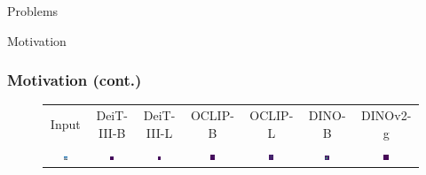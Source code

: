 \documentclass[aspectratio=169]{beamer}
\begin{document}
\begin{section}{Problems}
\begin{subsection}{Motivation}
\begin{frame}
\frametitle{Motivation (cont.)}
\vspace{0.5em}
\begin{figure}[h]
    \centering
    {\footnotesize
    \setlength{\tabcolsep}{2.5pt} %
    \renewcommand{\arraystretch}{0.4} %
    \begin{tabular}{c cc cc cc }
      \vspace{0.2em}
      Input & DeiT-III-B & DeiT-III-L & OCLIP-B & OCLIP-L & DINO-B & DINOv2-g \\
      \includegraphics[width=0.10\textwidth]{resources/230914_1202_fig2_vizs_various_models/109_orig.png} &
      \includegraphics[width=0.10\textwidth]{resources/230914_1202_fig2_vizs_various_models/deit3_base_patch16_224.fb_in22k_ft_in1k_109_lastattmap.png} &
      \includegraphics[width=0.10\textwidth]{resources/230914_1202_fig2_vizs_various_models/deit3_large_patch16_224.fb_in22k_ft_in1k_109_lastattmap.png} &
      \includegraphics[width=0.10\textwidth]{resources/230914_1202_fig2_vizs_various_models/vit_base_patch16_clip_224.laion2b_109_lastattmap.png} &
      \includegraphics[width=0.10\textwidth]{resources/230914_1202_fig2_vizs_various_models/vit_large_patch14_clip_224.laion2b_109_lastattmap.png} &
      \includegraphics[width=0.10\textwidth]{resources/230914_1202_fig2_vizs_various_models/vit_base_patch16_224.dino_109_lastattmap.png} &
      \includegraphics[width=0.10\textwidth]{resources/230914_1202_fig2_vizs_various_models/vit_giant_patch14_dinov2.lvd142m_109_lastattmap.png}

\end{tabular}}
\end{figure}
\end{frame}
\end{subsection}
\end{section}
\end{document}
